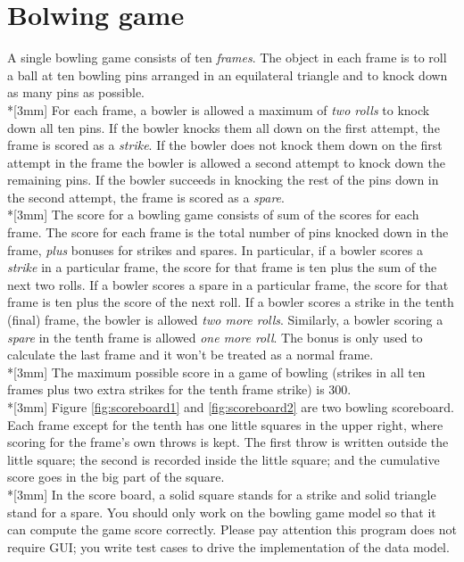 \section{Bolwing game}
\noindent A single bowling game consists of ten \textit{frames}. The object 
in each frame is to roll a ball at ten bowling pins arranged in an equilateral
triangle and to knock down as many pins as possible.\\*[3mm]
For each frame, a bowler is allowed a maximum of \textit{two rolls} to
knock down all ten pins. If the bowler knocks them all down on the first
attempt, the frame is scored as a \textit{strike}. If the bowler does not
knock them down on the first attempt in the frame the bowler is allowed a
second attempt to knock down the remaining pins. If the bowler succeeds in
knocking the rest of the pins down in the second attempt, the frame is
scored as a \textit{spare}.\\*[3mm]
The score for a bowling game consists of sum of the scores for each frame.
The score for each frame is the total number of pins knocked down in the
frame, \textit{plus} bonuses for strikes and spares. In particular, if a
bowler scores a \textit{strike} in a particular frame, the score for that
frame is ten plus the sum of the next two rolls. If a bowler scores a spare
in a particular frame, the score for that frame is ten plus the score of
the next roll. If a bowler scores a strike in the tenth (final) frame, the
bowler is allowed \textit{two more rolls}. Similarly, a bowler scoring a
\textit{spare} in the tenth frame is allowed \textit{one more roll}. The
bonus is only used to calculate the last frame and it won't be treated as a
normal frame.\\*[3mm]
The maximum possible score in a game of bowling (strikes in all ten frames
plus two extra strikes for the tenth frame strike) is 300.\\*[3mm]
Figure \ref{fig:scoreboard1} and \ref{fig:scoreboard2} are two bowling
scoreboard. Each frame except for the tenth has one little squares in the
upper right, where scoring for the frame's own throws is kept. The first
throw is written outside the little square; the second is recorded inside
the little square; and the cumulative score goes in the big part of the
square.\\*[3mm]
In the score board, a solid square stands for a strike and solid triangle
stand for a spare. You should only work on the bowling game model so that
it can compute the game score correctly. Please pay attention this program
does not require GUI; you write test cases to drive the implementation of
the data model.

